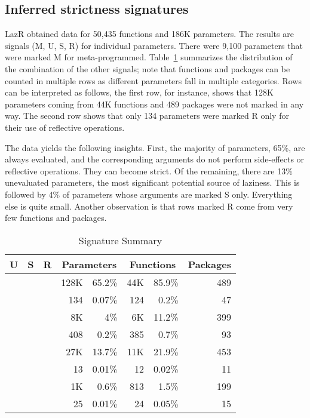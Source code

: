 \documentclass[review,nonacm,screen,acmsmall,anonymous=true]{acmart}
\newcommand{\xmark}{\textcolor{red}{\ding{55}}}
\newcommand{\cmark}{\textcolor{green}{\ding{51}}}
\newcommand{\lazr}{{\sf LazR}\xspace}
\begin{document}
\subsection{Inferred strictness signatures}\label{sec:results}

\lazr obtained data for 50,435 functions and 186K parameters. The results are
signals (M, U, S, R) for individual parameters. There were 9,100 parameters that
were marked M for meta-programmed. Table~\ref{table:strictdist} summarizes the
distribution of the combination of the other signals; note that functions and
packages can be counted in multiple rows as different parameters fall in
multiple categories. Rows can be interpreted as follows, the first row, for
instance, shows that 128K parameters coming from 44K functions and 489 packages
were not marked in any way. The second row shows that only 134 parameters
were marked R only for their use of reflective operations.

The data yields the following insights. First, the majority of parameters, 65\%,
are always evaluated, and the corresponding arguments do not perform
side-effects or reflective operations. They can become strict. Of the remaining,
there are 13\% unevaluated parameters, the most significant potential source of
laziness. This is followed by 4\% of parameters whose arguments are marked S
only. Everything else is quite small. Another observation is that rows marked R
come from very few functions and packages.

\begin{table}
  \vspace{-3mm}
  \small
  \caption{Signature Summary} \label{table:strictdist}
  \centering
  \begin{tabular}{cccrrrrr}
    \toprule
    \bf U & \bf S & \bf R & \multicolumn{2}{c}{\textbf{Parameters}} & \multicolumn{2}{c}{\textbf{Functions}}& \bf Packages\\
    \midrule
    \xmark{}&\xmark{}&\xmark{}&128K &65.2\%&44K  &85.9\%&489\\
    \xmark{}&\xmark{}&\cmark{}&134  &0.07\%&124  &0.2\%&47\\
    \xmark{}&\cmark{}&\xmark{}&8K   &4\%&6K      &11.2\%&399\\
    \xmark{}&\cmark{}&\cmark{}&408  &0.2\%&385   &0.7\%&93\\
    \cmark{}&\xmark{}&\xmark{}&27K  &13.7\%&11K  &21.9\%&453\\
    \cmark{}&\xmark{}&\cmark{}&13   &0.01\%&12   &0.02\%&11\\
    \cmark{}&\cmark{}&\xmark{}&1K   &0.6\%&813   &1.5\%&199\\
    \cmark{}&\cmark{}&\cmark{}&25   &0.01\%&24   &0.05\%&15\\
    \bottomrule
  \end{tabular}
\end{table}
\end{document}
